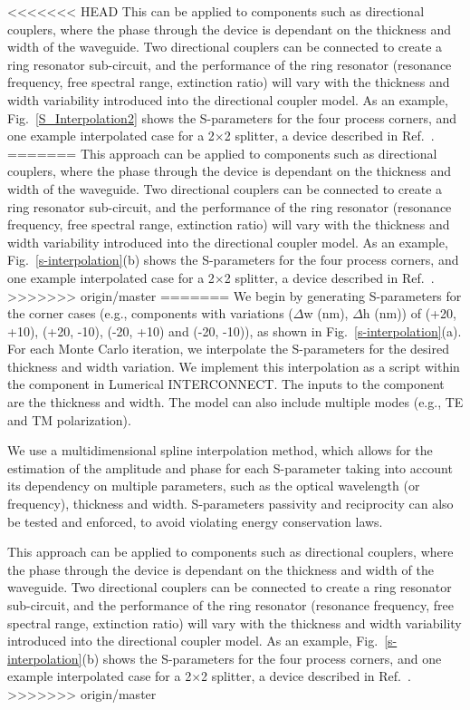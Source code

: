 \documentclass[journal]{spie}
\begin{document}
<<<<<<< HEAD
This can be applied to components such as directional couplers, where the phase through the device is dependant on the thickness and width of the waveguide.  Two directional couplers can be connected to create a ring resonator sub-circuit, and the performance of the ring resonator (resonance frequency, free spectral range, extinction ratio) will vary with the thickness and width variability introduced into the directional coupler model.  As an example, Fig.~\ref{S_Interpolation2} shows the S-parameters for the four process corners, and one example interpolated case for a 2$\times$2 splitter, a device described in Ref.~. 
=======
This approach can be applied to components such as directional couplers, where the phase through the device is dependant on the thickness and width of the waveguide.  Two directional couplers can be connected to create a ring resonator sub-circuit, and the performance of the ring resonator (resonance frequency, free spectral range, extinction ratio) will vary with the thickness and width variability introduced into the directional coupler model.  As an example, Fig.~\ref{s-interpolation}(b) shows the S-parameters for the four process corners, and one example interpolated case for a 2$\times$2 splitter, a device described in Ref.~. 
>>>>>>> origin/master
=======
We begin by generating S-parameters for the corner cases (e.g., components with variations ($\Delta$w (nm), $\Delta$h (nm)) of (+20, +10), (+20, -10), (-20, +10) and (-20, -10)), as shown in Fig.~\ref{s-interpolation}(a).  For each Monte Carlo iteration, we interpolate the S-parameters for the desired thickness and width variation.  We implement this interpolation as a script within the component in Lumerical INTERCONNECT.  The inputs to the component are the thickness and width.
The model can also include multiple modes (e.g., TE and TM polarization).

We use a multidimensional spline interpolation method, which allows for the estimation of the amplitude and phase for each S-parameter taking into account its dependency on multiple parameters, such as the optical wavelength (or frequency), thickness and width.  S-parameters passivity and reciprocity can also be tested and enforced, to avoid violating energy conservation laws.  

This approach can be applied to components such as directional couplers, where the phase through the device is dependant on the thickness and width of the waveguide.  Two directional couplers can be connected to create a ring resonator sub-circuit, and the performance of the ring resonator (resonance frequency, free spectral range, extinction ratio) will vary with the thickness and width variability introduced into the directional coupler model.  As an example, Fig.~\ref{s-interpolation}(b) shows the S-parameters for the four process corners, and one example interpolated case for a 2$\times$2 splitter, a device described in Ref.~. 
>>>>>>> origin/master
\end{document}
